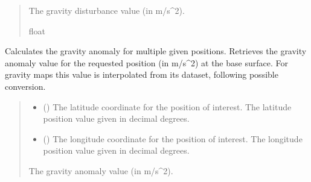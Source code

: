 \documentclass[letterpaper,10pt,english]{sphinxmanual}
\begin{document}
\begin{fulllineitems}
\begin{fulllineitems}
\begin{quote}
\begin{description}
\begin{itemize}
\end{itemize}

\sphinxAtStartPar
The gravity disturbance value (in m/s\textasciicircum{}2).

\sphinxAtStartPar
float

\end{description}\end{quote}

\end{fulllineitems}


\begin{fulllineitems}
\label{\detokenize{modules/gravity/map:qnav.gravity.map.GravityMap.get_anomaly_vec}}
\pysigstartsignatures
{}
\pysigstopsignatures
\sphinxAtStartPar
Calculates the gravity anomaly for multiple given positions.
Retrieves the gravity anomaly value for the requested position
(in m/s\textasciicircum{}2) at the base surface. For gravity maps this value is
interpolated from its dataset, following possible conversion.
\begin{quote}\begin{description}
\begin{itemize}
\item {} 
\sphinxAtStartPar
{} () \textendash{} The latitude coordinate for the position of interest.
The latitude position value given in decimal degrees.

\item {} 
\sphinxAtStartPar
{} () \textendash{} The longitude coordinate for the position of interest.
The longitude position value given in decimal degrees.

\end{itemize}

\sphinxAtStartPar
The gravity anomaly value (in m/s\textasciicircum{}2).


\end{description}
\end{quote}
\end{fulllineitems}
\end{fulllineitems}
\end{document}
